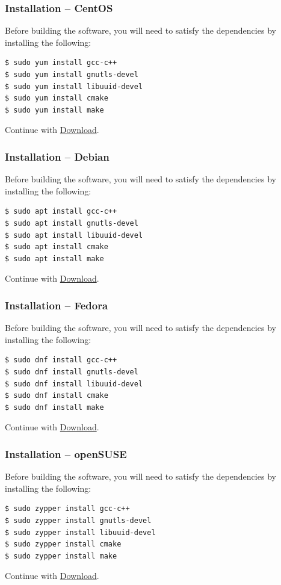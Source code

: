 \documentclass[t,handout]{beamer}
\begin{document}
\begin{frame}[fragile]\frametitle{Installation -- CentOS}\label{centos}
    Before building the software, you will need to satisfy the dependencies by installing the following:

    \begin{lstlisting}
$ sudo yum install gcc-c++
$ sudo yum install gnutls-devel
$ sudo yum install libuuid-devel
$ sudo yum install cmake
$ sudo yum install make
    \end{lstlisting}

    Continue with \hyperlink{download}{Download}.
\end{frame}

\begin{frame}[fragile]\frametitle{Installation -- Debian}\label{debian}
    Before building the software, you will need to satisfy the dependencies by installing the following:

    \begin{lstlisting}
$ sudo apt install gcc-c++
$ sudo apt install gnutls-devel
$ sudo apt install libuuid-devel
$ sudo apt install cmake
$ sudo apt install make
    \end{lstlisting}

    Continue with \hyperlink{download}{Download}.
\end{frame}

\begin{frame}[fragile]\frametitle{Installation -- Fedora}\label{fedora}
    Before building the software, you will need to satisfy the dependencies by installing the following:

    \begin{lstlisting}
$ sudo dnf install gcc-c++
$ sudo dnf install gnutls-devel
$ sudo dnf install libuuid-devel
$ sudo dnf install cmake
$ sudo dnf install make
    \end{lstlisting}

    Continue with \hyperlink{download}{Download}.
\end{frame}

\begin{frame}[fragile]\frametitle{Installation -- openSUSE}\label{opensuse}
    Before building the software, you will need to satisfy the dependencies by installing the following:

    \begin{lstlisting}
$ sudo zypper install gcc-c++
$ sudo zypper install gnutls-devel
$ sudo zypper install libuuid-devel
$ sudo zypper install cmake
$ sudo zypper install make
    \end{lstlisting}

    Continue with \hyperlink{download}{Download}.
\end{frame}
\end{document}
